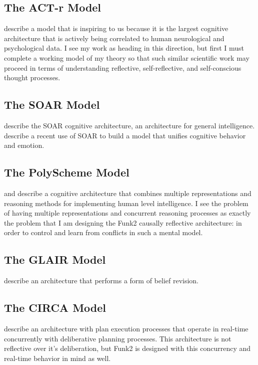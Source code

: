 \subsection{The ACT-r Model}

\cite{anderson:2004} describe a model that is inspiring to us because it is the largest cognitive architecture that is actively being correlated to human neurological and psychological data.
I see my work as heading in this direction, but first I must complete a working model of my theory so that such similar scientific work may proceed in terms of understanding reflective, self-reflective, and self-conscious thought processes.

\subsection{The SOAR Model}

\cite{laird:1987} describe the SOAR cognitive architecture, an architecture for general intelligence.
\cite{marinier:2009} describe a recent use of SOAR to build a model that unifies cognitive behavior and emotion.

\subsection{The PolyScheme Model}

\cite{cassimatis:2004} and \cite{cassimatis:2006} describe a cognitive architecture that combines multiple representations and reasoning methods for implementing human level intelligence.
I see the problem of having multiple representations and concurrent reasoning processes as exactly the problem that I am designing the Funk2 causally reflective architecture: in order to control and learn from conflicts in such a mental model.

\subsection{The GLAIR Model}

\cite{shapiro:2003} describe an architecture that performs a form of belief revision.

\subsection{The CIRCA Model}

\cite{musliner:2001} describe an architecture with plan execution processes that operate in real-time concurrently with deliberative planning processes.
This architecture is not reflective over it's deliberation, but Funk2 is designed with this concurrency and real-time behavior in mind as well.

